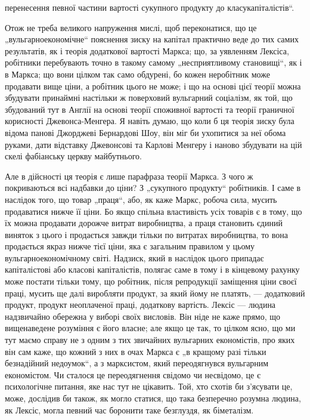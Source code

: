 \parcont{}  %
перенесення певної частини вартості сукупного продукту до
класу\linebreak[4]
капіталістів“.

Отож не треба великого напруження мислі, щоб переконатися,
що це „вульгарноекономічне“ пояснення зиску на капітал
практично веде до тих самих результатів, як і теорія додаткової
вартості Маркса; що, за уявленням Лексіса, робітники
перебувають точно в такому самому „несприятливому становищі“,
як і в Маркса; що вони цілком так само обдурені, бо
кожен неробітник може продавати вище ціни, а робітник цього
не може; і що на основі цієї теорії можна збудувати принаймні
настільки ж поверховий вульгарний соціалізм, як той, що збудований
тут в Англії на основі теорії споживної вартості та
теорії граничної корисності Джевонса-Менгера. Я навіть думаю,
що коли б ця теорія зиску була відома панові Джорджеві Бернардові
Шоу, він міг би ухопитися за неї обома руками, дати
відставку Джевонсові та Карлові Менгеру і наново збудувати
на цій скелі фабіанську церкву майбутнього.

Але в дійсності ця теорія є лише парафраза теорії Маркса.
З чого ж покриваються всі надбавки до ціни? З „сукупного
продукту“ робітників. І саме в наслідок того, що товар „праця“,
або, як каже Маркс, робоча сила, мусить продаватися нижче її
ціни. Бо якщо спільна властивість усіх товарів є в тому, що їх
можна продавати дорожче витрат виробництва, а праця становить
єдиний виняток з цього і продається завжди тільки по витратах
виробництва, то вона продається якраз нижче тієї ціни, яка є
загальним правилом у цьому вульгарноекономічному світі. Надзиск,
який в наслідок цього припадає капіталістові або класові
капіталістів, полягає саме в тому і в кінцевому рахунку може
постати тільки тому, що робітник, після репродукції заміщення
ціни своєї праці, мусить ще далі виробляти продукт, за який
йому не платять, — додатковий продукт, продукт неоплаченої
праці, додаткову вартість. Лексіс — людина надзвичайно обережна
у виборі своїх висловів. Він ніде не каже прямо, що
вищенаведене розуміння є його власне; але якщо це так, то
цілком ясно, що ми тут маємо справу не з одним з тих звичайних
вульгарних економістів, про яких він сам каже, що кожний
з них в очах Маркса є „в кращому разі тільки безнадійний недоумок“,
а з марксистом, який переодягнувся вульгарним економістом.
Чи сталося це переодягнення свідомо чи несвідомо, це
є психологічне питання, яке нас тут не цікавить. Той, хто схотів
би з’ясувати це, може, дослідив би також, як могло статися, що
така безперечно розумна людина, як Лексіс, могла певний час
боронити таке безглуздя, як біметалізм.

